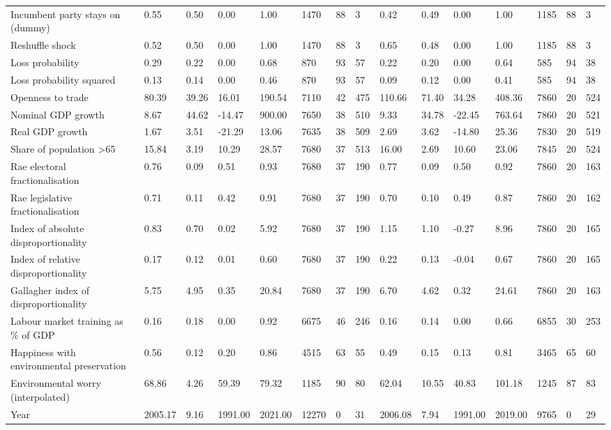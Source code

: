 \begin{longtable}{lllllllllllllll}
Incumbent party stays on (dummy) & 0.55 & 0.50 & 0.00 & 1.00 & 1470 & 88 & 3 & 0.42 & 0.49 & 0.00 & 1.00 & 1185 & 88 & 3\\
Reshuffle shock & 0.52 & 0.50 & 0.00 & 1.00 & 1470 & 88 & 3 & 0.65 & 0.48 & 0.00 & 1.00 & 1185 & 88 & 3\\
\addlinespace
Loss probability & 0.29 & 0.22 & 0.00 & 0.68 & 870 & 93 & 57 & 0.22 & 0.20 & 0.00 & 0.64 & 585 & 94 & 38\\
Loss probability squared & 0.13 & 0.14 & 0.00 & 0.46 & 870 & 93 & 57 & 0.09 & 0.12 & 0.00 & 0.41 & 585 & 94 & 38\\
Openness to trade & 80.39 & 39.26 & 16.01 & 190.54 & 7110 & 42 & 475 & 110.66 & 71.40 & 34.28 & 408.36 & 7860 & 20 & 524\\
Nominal GDP growth & 8.67 & 44.62 & -14.47 & 900.00 & 7650 & 38 & 510 & 9.33 & 34.78 & -22.45 & 763.64 & 7860 & 20 & 521\\
Real GDP growth & 1.67 & 3.51 & -21.29 & 13.06 & 7635 & 38 & 509 & 2.69 & 3.62 & -14.80 & 25.36 & 7830 & 20 & 519\\
\addlinespace
Share of population >65 & 15.84 & 3.19 & 10.29 & 28.57 & 7680 & 37 & 513 & 16.00 & 2.69 & 10.60 & 23.06 & 7845 & 20 & 524\\
Rae electoral fractionalisation & 0.76 & 0.09 & 0.51 & 0.93 & 7680 & 37 & 190 & 0.77 & 0.09 & 0.50 & 0.92 & 7860 & 20 & 163\\
Rae legislative fractionalisation & 0.71 & 0.11 & 0.42 & 0.91 & 7680 & 37 & 190 & 0.70 & 0.10 & 0.49 & 0.87 & 7860 & 20 & 162\\
Index of absolute disproportionality & 0.83 & 0.70 & 0.02 & 5.92 & 7680 & 37 & 190 & 1.15 & 1.10 & -0.27 & 8.96 & 7860 & 20 & 165\\
Index of relative disproportionality & 0.17 & 0.12 & 0.01 & 0.60 & 7680 & 37 & 190 & 0.22 & 0.13 & -0.04 & 0.67 & 7860 & 20 & 165\\
\addlinespace
Gallagher index of disproportionality & 5.75 & 4.95 & 0.35 & 20.84 & 7680 & 37 & 190 & 6.70 & 4.62 & 0.32 & 24.61 & 7860 & 20 & 163\\
Labour market training as \% of GDP & 0.16 & 0.18 & 0.00 & 0.92 & 6675 & 46 & 246 & 0.16 & 0.14 & 0.00 & 0.66 & 6855 & 30 & 253\\
Happiness with environmental preservation & 0.56 & 0.12 & 0.20 & 0.86 & 4515 & 63 & 55 & 0.49 & 0.15 & 0.13 & 0.81 & 3465 & 65 & 60\\
Environmental worry (interpolated) & 68.86 & 4.26 & 59.39 & 79.32 & 1185 & 90 & 80 & 62.04 & 10.55 & 40.83 & 101.18 & 1245 & 87 & 83\\
Year & 2005.17 & 9.16 & 1991.00 & 2021.00 & 12270 & 0 & 31 & 2006.08 & 7.94 & 1991.00 & 2019.00 & 9765 & 0 & 29\\
\bottomrule
\end{longtable}
